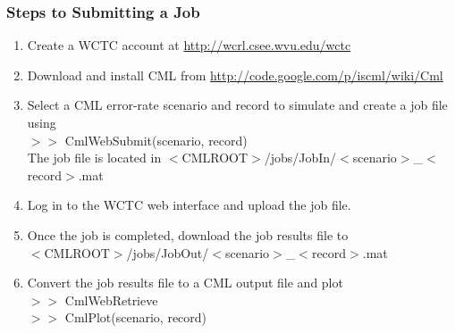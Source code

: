 \begin{frame}
\frametitle{Steps to Submitting a Job}

\begin{enumerate}
\item Create a WCTC account at \url{http://wcrl.csee.wvu.edu/wctc}

\item Download and install CML from \url{http://code.google.com/p/iscml/wiki/Cml}

\item Select a CML error-rate scenario and record to simulate and create a job file using
\\ $>>$ CmlWebSubmit(scenario, record)
\vspace{3mm}
\\ The job file is located in $<$CMLROOT$>$/jobs/JobIn/$<$scenario$>$\_$<$record$>$.mat

\item Log in to the WCTC web interface and upload the job file.

\item Once the job is completed, download the job results file to \\
$<$CMLROOT$>$/jobs/JobOut/$<$scenario$>$\_$<$record$>$.mat

\item Convert the job results file to a CML output file and plot
\\ $>>$ CmlWebRetrieve
\\ $>>$ CmlPlot(scenario, record)
\end{enumerate}

\end{frame}
